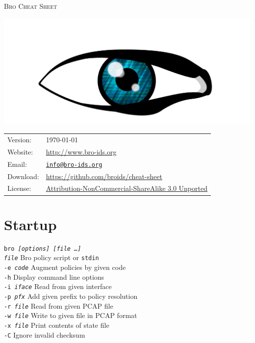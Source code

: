 \documentclass[10pt,landscape]{article}
\begin{document}
\begin{multicols*}{3}

{\Huge\scshape
Bro\hspace{-2pt}\hspace{-4pt}
Cheat Sheet}

\hfill\includegraphics[width=.4\linewidth]{bro-logo-small}
\vspace{-38pt}

{\scriptsize
{}
\begin{tabular}{l l}
Version: & \today\\
Website: & \url{http://www.bro-ids.org}\\
Email: & \texttt{\href{mailto:info@bro-ids.org}{info@bro-ids.org}}\\
Download: & \url{https://github.com/broids/cheat-sheet}\\
License: & \href{http://creativecommons.org/licenses/by-nc-sa/3.0/}
                {Attribution-NonCommercial-ShareAlike 3.0 Unported}
\end{tabular}
}


\vspace{-10pt}

\section*{Startup}

\texttt{bro \textit{[options] [file \dots]}}\\
\texttt{\textit{file}} \dotfill Bro policy script or \texttt{stdin}\\
\texttt{-e \textit{code}} \dotfill Augment policies by given code\\
\texttt{-h} \dotfill Display command line options\\
\texttt{-i \textit{iface}} \dotfill Read from given interface\\
\texttt{-p \textit{pfx}} \dotfill Add given prefix to policy resolution\\
\texttt{-r \textit{file}} \dotfill Read from given PCAP file\\
\texttt{-w \textit{file}} \dotfill Write to given file in PCAP format\\
\texttt{-x \textit{file}} \dotfill Print contents of state file\\
\texttt{-C} \dotfill Ignore invalid checksum


\end{multicols*}
\end{document}
